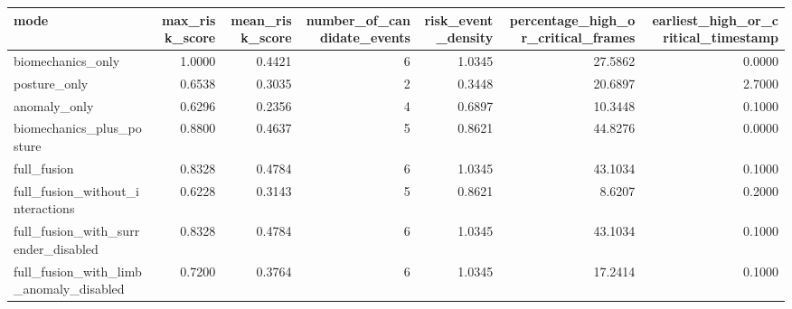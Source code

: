 \begin{tabular}{lrrrrrr}
\toprule
mode & max\_risk\_score & mean\_risk\_score & number\_of\_candidate\_events & risk\_event\_density & percentage\_high\_or\_critical\_frames & earliest\_high\_or\_critical\_timestamp \\
\midrule
biomechanics\_only & 1.0000 & 0.4421 & 6 & 1.0345 & 27.5862 & 0.0000 \\
posture\_only & 0.6538 & 0.3035 & 2 & 0.3448 & 20.6897 & 2.7000 \\
anomaly\_only & 0.6296 & 0.2356 & 4 & 0.6897 & 10.3448 & 0.1000 \\
biomechanics\_plus\_posture & 0.8800 & 0.4637 & 5 & 0.8621 & 44.8276 & 0.0000 \\
full\_fusion & 0.8328 & 0.4784 & 6 & 1.0345 & 43.1034 & 0.1000 \\
full\_fusion\_without\_interactions & 0.6228 & 0.3143 & 5 & 0.8621 & 8.6207 & 0.2000 \\
full\_fusion\_with\_surrender\_disabled & 0.8328 & 0.4784 & 6 & 1.0345 & 43.1034 & 0.1000 \\
full\_fusion\_with\_limb\_anomaly\_disabled & 0.7200 & 0.3764 & 6 & 1.0345 & 17.2414 & 0.1000 \\
\bottomrule
\end{tabular}
